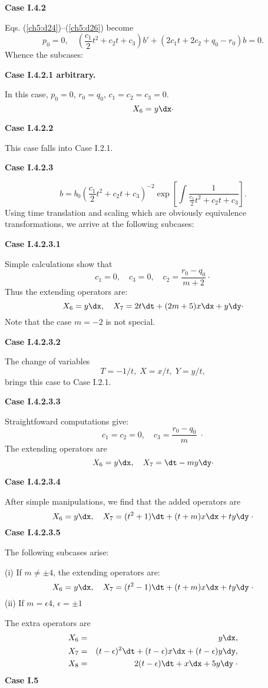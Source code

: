 {\bf Case I.4.2 }

Eqs. (\ref{ch5:d24})--(\ref{ch5:d26}) become
\[
p_0 =0 ,\quad
(\frac{c_1}{2}t^2+c_2t+c_3)b'+(2c_1t+2c_2+q_0-r_0)b = 0 .
\]
Whence the subcases:

{\bf Case I.4.2.1   arbitrary.}

In this case, $p_0=0$, $r_0=q_0$, $c_1=c_2=c_3=0$.
\[X_6=y\dx\cdot \]

{\bf Case I.4.2.2 }

This case falls into Case I.2.1.

{\bf Case I.4.2.3  }

\[b=b_0(\frac{c_1}{2}t^2+c_2t+c_3)^{-2}\exp \left [
\int \frac{1}{\frac{c_1}{2}t^2+c_2t+c_3} \right ].  \]
Using time translation and scaling which are obviously
equivalence transformations, we arrive at the following subcases:

{\bf Case I.4.2.3.1  }

Simple calculations show that
\[ c_1= 0,\quad c_3=0,\quad c_2 = \frac{r_0-q_0}{m+2}\cdot \]
Thus the extending operators are:
\[ X_6  = y\dx,\quad X_7  =  2t\dt +(2m+5)x\dx + y\dy \cdot \]
Note that the case $m=-2$ is not special.

{\bf Case I.4.2.3.2 }

The change of variables
\[T=-1/t,\;X=x/t,\;Y=y/t,\]
brings this case to Case I.2.1. 

{\bf Case I.4.2.3.3  }

Straightfoward computations give:
\[ c_1=c_2 = 0,\quad c_3 =\frac{r_0-q_0}{m}\; \cdot  \]
The extending operators are
\[X_6 = y\dx,\quad X_7 = \dt-my\dy \cdot \]

{\bf Case I.4.2.3.4  }

After simple manipulations, we find that the added operators are
\[ X_6 = y\dx,\quad X_7 = (t^2+1)\dt + (t+m)x\dx+ ty\dy \;\cdot \]
{\bf Case I.4.2.3.5  }

The following subcases arise:

(i) If $m\ne \pm 4$, the extending operators are:
\[ X_6 =y\dx,\quad X_7 = (t^2-1)\dt +(t+m)x\dx +ty \dy \;\cdot \]
(ii) If $m=\epsilon 4$, $\epsilon=\pm 1$

The extra operators are
\begin{eqnarray*}
X_6 &=& y\dx,\\
X_7 &=& (t-\epsilon)^2\dt +(t-\epsilon)x\dx + (t-\epsilon)y\dy,\\
X_8 &=& 2(t-\epsilon)\dt +x\dx + 5y \dy \;\cdot
\end{eqnarray*}
{\bf Case I.5 }

